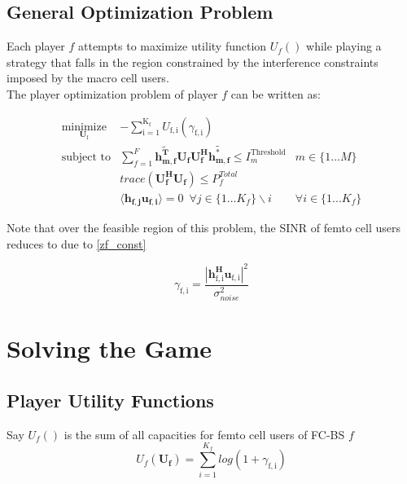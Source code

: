 \documentclass[12pt]{article}
\begin{document}
\subsection{General Optimization Problem}

Each player $f$ attempts to maximize utility function $U_f()$ while playing a strategy that falls in the region constrained by the interference constraints imposed by the macro cell users.
\\

The player optimization problem of player $f$ can be written as:

	
	\begin{subequations}
	\label{eq:optim}
	\begin{align}
	    \underset{\mathbf{U_{\mathrm{f}}} }{\text{minimize}}
	    & - \sum_{\mathrm{i=1}}^{\mathrm{K_f}}
    	U_{\mathrm{f,i}}(\gamma_{\mathrm{f,i}})\label{player_opt} \\
	    \text{subject to}  &
	    \sum^F_{f=1}\mathbf{\tilde{h_{m,f}^T}}  \mathbf{U_f}  \mathbf{U_f^H}
		\mathbf{\tilde{h_{m,f}^*}} \leq I^{\mathrm{Threshold}}_{m} & m \in \{1 ...M\} 
		\label{interference_const}\\
        & trace(\mathbf{U_f^H}\mathbf{U_f}) \leq P^{Total}_{f} \label{power_const}\\
        & \langle \mathbf{h_{f,j}}\mathbf{u_{f,i}} \rangle =0\ \; \forall j \in \{1... K_f\}				\backslash i &\forall i \in \{1 ... K_f\} \label{zf_const}
	\end{align}
	\end{subequations}

	
Note that over the feasible region of this problem, the SINR of femto cell users reduces to due to  \eqref{zf_const}

	\begin{equation}\label{zf_snr}
	\gamma_{\mathrm{f,i}} = \frac{|\mathbf{h^H_{\mathrm{f,i}}u_{\mathrm{f,i}}}|^2}
	{\sigma^2_{noise}  
	}
	\end{equation}

\section{Solving the Game}
\subsection{Player Utility Functions}

Say $U_f() $ is the sum of all capacities for femto cell users of FC-BS $f$ 
\begin{displaymath}
U_f(\mathbf{U_f}) = \sum^{K_f}_{i=1} log(1+\gamma_{\mathrm{f,i}})
\end{displaymath}
\end{document}
